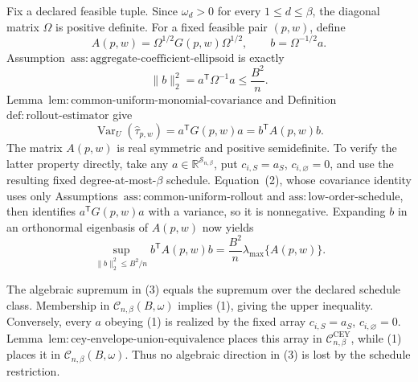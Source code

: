 Fix a declared feasible tuple.  Since \(\omega_d>0\) for every \(1\le d\le\beta\), the diagonal matrix \(\Omega\) is positive definite.  For a fixed feasible pair \((p,w)\), define
\[
A(p,w)=\Omega^{1/2}G(p,w)\Omega^{1/2},
\qquad b=\Omega^{-1/2}a.
\]
Assumption~\(\mathrm{ass{:}aggregate\text{-}coefficient\text{-}ellipsoid}\) is exactly
\[
\lVert b\rVert_2^2=a^{\mathsf T}\Omega^{-1}a\le \frac{B^2}{n}.
\tag{1}
\]
Lemma~\(\mathrm{lem{:}common\text{-}uniform\text{-}monomial\text{-}covariance}\) and Definition~\(\mathrm{def{:}rollout\text{-}estimator}\) give
\[
\operatorname{Var}_U(\widehat\tau_{p,w})
=a^{\mathsf T}G(p,w)a
=b^{\mathsf T}A(p,w)b.
\tag{2}
\]
The matrix \(A(p,w)\) is real symmetric and positive semidefinite.  To verify the latter property directly, take any \(a\in\mathbb R^{\mathcal S_{n,\beta}}\), put \(c_{i,S}=a_S\), \(c_{i,\varnothing}=0\), and use the resulting fixed degree-at-most-\(\beta\) schedule.  Equation~(2), whose covariance identity uses only Assumptions~\(\mathrm{ass{:}common\text{-}uniform\text{-}rollout}\) and \(\mathrm{ass{:}low\text{-}order\text{-}schedule}\), then identifies \(a^{\mathsf T}G(p,w)a\) with a variance, so it is nonnegative.  Expanding \(b\) in an orthonormal eigenbasis of \(A(p,w)\) now yields
\[
\sup_{\lVert b\rVert_2^2\le B^2/n}b^{\mathsf T}A(p,w)b
=\frac{B^2}{n}\lambda_{\max}\{A(p,w)\}.
\tag{3}
\]

The algebraic supremum in (3) equals the supremum over the declared schedule class.  Membership in \(\mathcal C_{n,\beta}(B,\omega)\) implies (1), giving the upper inequality.  Conversely, every \(a\) obeying (1) is realized by the fixed array \(c_{i,S}=a_S\), \(c_{i,\varnothing}=0\).  Lemma~\(\mathrm{lem{:}cey\text{-}envelope\text{-}union\text{-}equivalence}\) places this array in \(\mathcal C^{\mathrm{CEY}}_{n,\beta}\), while (1) places it in \(\mathcal C_{n,\beta}(B,\omega)\).  Thus no algebraic direction in (3) is lost by the schedule restriction.

